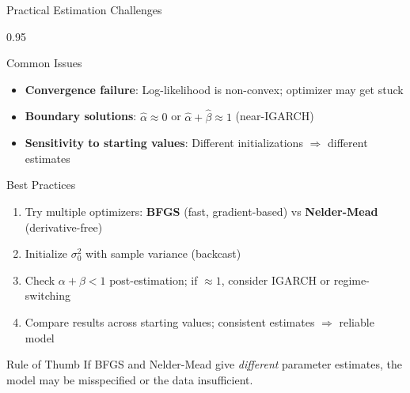 \documentclass[9pt, aspectratio=169, t]{beamer}
\begin{document}
\begin{frame}{Practical Estimation Challenges}
    \begin{cminipage}{0.95\textwidth}
    \small
    \begin{block}{Common Issues}
        \begin{itemize}\setlength{\itemsep}{0pt}
            \item \textbf{Convergence failure}: Log-likelihood is non-convex; optimizer may get stuck
            \item \textbf{Boundary solutions}: $\hat{\alpha} \approx 0$ or $\hat{\alpha} + \hat{\beta} \approx 1$ (near-IGARCH)
            \item \textbf{Sensitivity to starting values}: Different initializations $\Rightarrow$ different estimates
        \end{itemize}
    \end{block}
    \vspace{-0.1cm}
    \begin{exampleblock}{Best Practices}
        \begin{enumerate}\setlength{\itemsep}{0pt}
            \item Try multiple optimizers: \textbf{BFGS} (fast, gradient-based) vs \textbf{Nelder-Mead} (derivative-free)
            \item Initialize $\sigma_0^2$ with sample variance (backcast)
            \item Check $\alpha + \beta < 1$ post-estimation; if $\approx 1$, consider IGARCH or regime-switching
            \item Compare results across starting values; consistent estimates $\Rightarrow$ reliable model
        \end{enumerate}
    \end{exampleblock}
    \vspace{-0.1cm}
    \begin{alertblock}{Rule of Thumb}
        If BFGS and Nelder-Mead give \textit{different} parameter estimates, the model may be misspecified or the data insufficient.
    \end{alertblock}
    \end{cminipage}
\end{frame}
\end{document}
